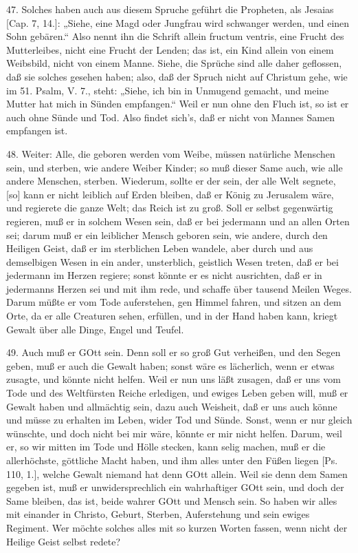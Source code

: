 47. Solches haben auch aus diesem Spruche geführt die Propheten, als Jesaias [Cap. 7, 14.]: „Siehe, eine Magd oder Jungfrau wird schwanger werden, und einen Sohn gebären.“ Also nennt ihn die Schrift allein fructum ventris, eine Frucht des Mutterleibes, nicht eine Frucht der Lenden; das ist, ein Kind allein von einem Weibsbild, nicht von einem Manne. Siehe, die Sprüche sind alle daher geflossen, daß sie solches gesehen haben; also, daß der Spruch nicht auf Christum gehe, wie im 51. Psalm, V. 7., steht: „Siehe, ich bin in Unmugend gemacht, und meine Mutter hat mich in Sünden empfangen.“ Weil er nun ohne den Fluch ist, so ist er auch ohne Sünde und Tod. Also findet sich’s, daß er nicht von Mannes Samen empfangen ist.

48. Weiter: Alle, die geboren werden vom Weibe, müssen natürliche Menschen sein, und sterben, wie andere Weiber Kinder; so muß dieser Same auch, wie alle andere Menschen, sterben. Wiederum, sollte er der sein, der alle Welt segnete, [so] kann er nicht leiblich auf Erden bleiben, daß er König zu Jerusalem wäre, und regierete die ganze Welt; das Reich ist zu groß. Soll er selbst gegenwärtig regieren, muß er in solchem Wesen sein, daß er bei jedermann und an allen Orten sei; darum muß er ein leiblicher Mensch geboren sein, wie andere, durch den Heiligen Geist, daß er im sterblichen Leben wandele, aber durch und aus demselbigen Wesen in ein ander, unsterblich, geistlich Wesen treten, daß er bei jedermann im Herzen regiere; sonst könnte er es nicht ausrichten, daß er in jedermanns Herzen sei und mit ihm rede, und schaffe über tausend Meilen Weges. Darum müßte er vom Tode auferstehen, gen Himmel fahren, und sitzen an dem Orte, da er alle Creaturen sehen, erfüllen, und in der Hand haben kann, kriegt Gewalt über alle Dinge, Engel und Teufel.

49. Auch muß er GOtt sein. Denn soll er so groß Gut verheißen, und den Segen geben, muß er auch die Gewalt haben; sonst wäre es lächerlich, wenn er etwas zusagte, und könnte nicht helfen. Weil er nun uns läßt zusagen, daß er uns vom Tode und des Weltfürsten Reiche erledigen, und ewiges Leben geben will, muß er Gewalt haben und allmächtig sein, dazu auch Weisheit, daß er uns auch könne und müsse zu erhalten im Leben, wider Tod und Sünde. Sonst, wenn er nur gleich wünschte, und doch nicht bei mir wäre, könnte er mir nicht helfen. Darum, weil er, so wir mitten im Tode und Hölle stecken, kann selig machen, muß er die allerhöchste, göttliche Macht haben, und ihm alles unter den Füßen liegen [Ps. 110, 1.], welche Gewalt niemand hat denn GOtt allein. Weil sie denn dem Samen gegeben ist, muß er unwidersprechlich ein wahrhaftiger GOtt sein, und doch der Same bleiben, das ist, beide wahrer GOtt und Mensch sein. So haben wir alles mit einander in Christo, Geburt, Sterben, Auferstehung und sein ewiges Regiment. Wer möchte solches alles mit so kurzen Worten fassen, wenn nicht der Heilige Geist selbst redete?

